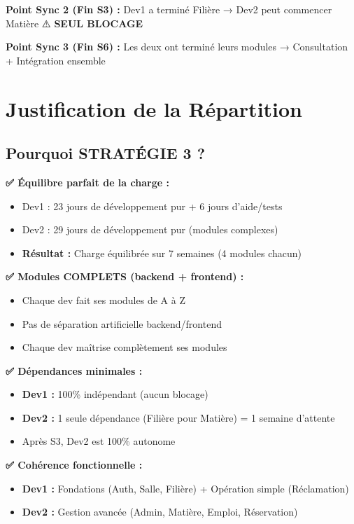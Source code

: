 \documentclass[12pt,a4paper]{article}
\begin{document}
\textbf{Point Sync 2 (Fin S3) :} Dev1 a terminé Filière → Dev2 peut commencer Matière ⚠️ \textbf{SEUL BLOCAGE}

\textbf{Point Sync 3 (Fin S6) :} Les deux ont terminé leurs modules → Consultation + Intégration ensemble

\newpage

\section{Justification de la Répartition}

\subsection{Pourquoi STRATÉGIE 3 ?}

\textbf{✅ Équilibre parfait de la charge :}
\begin{itemize}
    \item Dev1 : 23 jours de développement pur + 6 jours d'aide/tests
    \item Dev2 : 29 jours de développement pur (modules complexes)
    \item \textbf{Résultat :} Charge équilibrée sur 7 semaines (4 modules chacun)
\end{itemize}

\textbf{✅ Modules COMPLETS (backend + frontend) :}
\begin{itemize}
    \item Chaque dev fait ses modules de A à Z
    \item Pas de séparation artificielle backend/frontend
    \item Chaque dev maîtrise complètement ses modules
\end{itemize}

\textbf{✅ Dépendances minimales :}
\begin{itemize}
    \item \textbf{Dev1 :} 100\% indépendant (aucun blocage)
    \item \textbf{Dev2 :} 1 seule dépendance (Filière pour Matière) = 1 semaine d'attente
    \item Après S3, Dev2 est 100\% autonome
\end{itemize}

\textbf{✅ Cohérence fonctionnelle :}
\begin{itemize}
    \item \textbf{Dev1 :} Fondations (Auth, Salle, Filière) + Opération simple (Réclamation)
    \item \textbf{Dev2 :} Gestion avancée (Admin, Matière, Emploi, Réservation)
\end{itemize}
\end{document}
